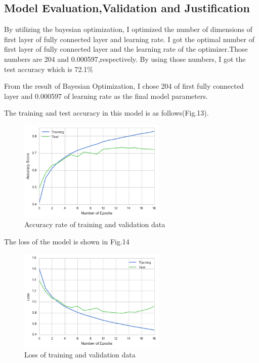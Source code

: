 \subsection{Model Evaluation,Validation and Justification}

By utilizing the bayesian optimization, I optimized the number of dimensions of first layer of fully connected layer and learning rate. I got the optimal number of first layer of fully connected layer and the learning rate of the optimizer.Those numbers are 204 and 0.000597,respectively. By using those numbers, I got the test accuracy which is 72.1\%


From the result of Bayesian Optimization, I chose 204 of first fully connected layer and 0.000597 of learning rate as the final model parameters.


The training and test accuracy in this model is as follows(Fig.13).


\begin{figure}[H]

	\begin{center}
	\includegraphics[width=7cm]{picture/final_model_accuracy.png}
	\caption{Accuracy rate of training and validation data}
	\end{center}
	\label{fig:13}

\end{figure}


The loss of the model is shown in Fig.14

 \begin{figure}[H]

	\begin{center}
	\includegraphics[width=7cm]{picture/final_loss.png}
	\caption{Loss of training and validation data}
	\end{center}
	\label{fig:14}

\end{figure}



